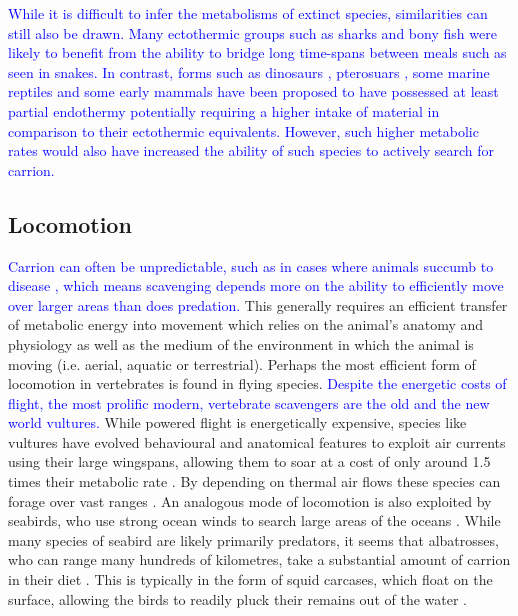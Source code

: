 \documentclass[a4paper,12pt]{article}
\begin{document}
\textcolor{blue}{While it is difficult to infer the metabolisms of extinct species, similarities can still also be drawn. Many ectothermic groups such as sharks and bony fish were likely to benefit from the ability to bridge long time-spans between meals such as seen in snakes. In contrast, forms such as dinosaurs \citep{grady2014evidence}, pterosuars \citep{wellnhofer1991illustrated}, some marine reptiles \citep{bernard2010regulation} and some early mammals \citep{lovegrove2016phenology} have been proposed to have possessed at least partial endothermy potentially requiring a higher intake of material in comparison to their ectothermic equivalents. However, such higher metabolic rates would also have increased the ability of such species to actively search for carrion.}

\subsection{Locomotion}
\textcolor{blue}{Carrion can often be unpredictable, such as in cases where animals succumb to disease \citep{devault2003scavenging}, which means scavenging depends more on the ability to efficiently move over larger areas than does predation.}
This generally requires an efficient transfer of metabolic energy into movement which relies on the animal's anatomy and physiology as well as the medium of the environment in which the animal is moving (i.e. aerial, aquatic or terrestrial).
Perhaps the most efficient form of locomotion in vertebrates is found in flying species. 
\textcolor{blue}{Despite the energetic costs of flight, the most prolific modern, vertebrate scavengers are the old and the new world vultures.} 
While powered flight is energetically expensive, species like vultures have evolved behavioural and anatomical features to exploit air currents using their large wingspans, allowing them to soar at a cost of only around 1.5 times their metabolic rate \citep{hedenstrom1993migration,duriez2014cheap}.
By depending on thermal air flows these species can forage over vast ranges \citep{spiegel2013factors}. 
An analogous mode of locomotion is also exploited by seabirds, who use strong ocean winds to search large areas of the oceans \citep{norberg2012vertebrate,thaxter2012seabird}. 
While many species of seabird are likely primarily predators, it seems that albatrosses, who can range many hundreds of kilometres, take a substantial amount of carrion in their diet \citep{croxall1994dead}. 
This is typically in the form of squid carcases, which float on the surface, allowing the birds to readily pluck their remains out of the water \citep{croxall1994dead}. 
\end{document}
